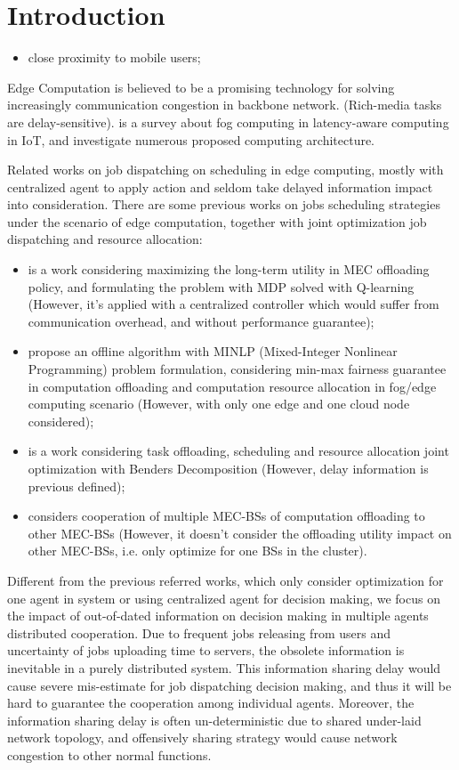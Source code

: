
\section{Introduction}

\begin{itemize}
    \item close proximity to mobile users;
\end{itemize}

Edge Computation is believed to be a promising technology for solving increasingly communication congestion in backbone network.
(Rich-media tasks are delay-sensitive).
\cite{Naha2018} is a survey about fog computing in latency-aware computing in IoT, and investigate numerous proposed computing architecture.


Related works on job dispatching on scheduling in edge computing, mostly with centralized agent to apply action and seldom take delayed information impact into consideration.
There are some previous works on jobs scheduling strategies under the scenario of edge computation, together with joint optimization job dispatching and resource allocation:
\begin{itemize}
    \item \cite{Zheng2019} is a work considering maximizing the long-term utility in MEC offloading policy, and formulating the problem with MDP solved with Q-learning (However, it's applied with a centralized controller which would suffer from communication overhead, and without performance guarantee);
    \item \cite{Du2018} propose an offline algorithm with MINLP (Mixed-Integer Nonlinear Programming) problem formulation, considering min-max fairness guarantee in computation offloading and computation resource allocation in fog/edge computing scenario (However, with only one edge and one cloud node considered);
    \item \cite{Alameddine2019} is a work considering task offloading, scheduling and resource allocation joint optimization with Benders Decomposition (However, delay information is previous defined);
    \item \cite{Fan2017} considers cooperation of multiple MEC-BSs of computation offloading to other MEC-BSs (However, it doesn't consider the offloading utility impact on other MEC-BSs, i.e. only optimize for one BSs in the cluster).
\end{itemize}


Different from the previous referred works, which only consider optimization for one agent in system or using centralized agent for decision making, we focus on the impact of out-of-dated information on decision making in multiple agents distributed cooperation.
Due to frequent jobs releasing from users and uncertainty of jobs uploading time to servers, the obsolete information is inevitable in a purely distributed system.
This information sharing delay would cause severe mis-estimate for job dispatching decision making, and thus it will be hard to guarantee the cooperation among individual agents.
Moreover, the information sharing delay is often un-deterministic due to shared under-laid network topology, and offensively sharing strategy would cause network congestion to other normal functions.


